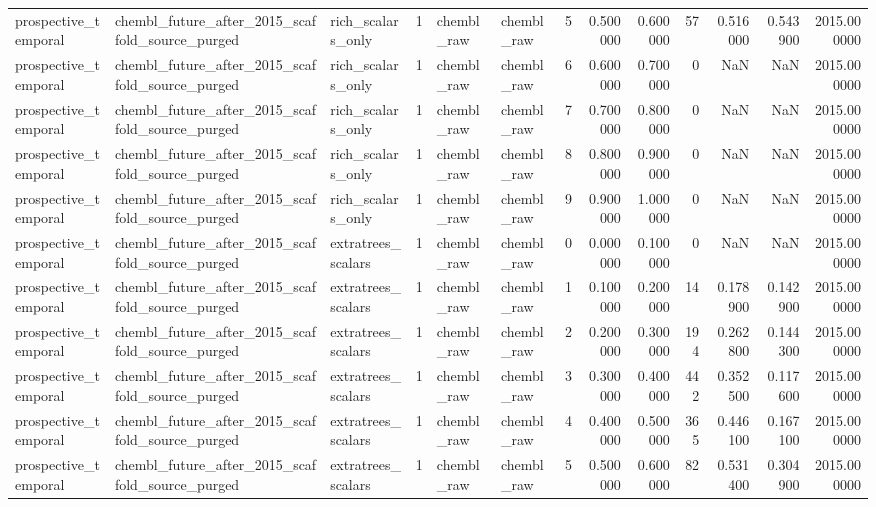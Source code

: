 \begin{longtable}{lllrllrrrrrrr}
prospective\_temporal & chembl\_future\_after\_2015\_scaffold\_source\_purged & rich\_scalars\_only & 1 & chembl\_raw & chembl\_raw & 5 & 0.500000 & 0.600000 & 57 & 0.516000 & 0.543900 & 2015.000000 \\
prospective\_temporal & chembl\_future\_after\_2015\_scaffold\_source\_purged & rich\_scalars\_only & 1 & chembl\_raw & chembl\_raw & 6 & 0.600000 & 0.700000 & 0 & NaN & NaN & 2015.000000 \\
prospective\_temporal & chembl\_future\_after\_2015\_scaffold\_source\_purged & rich\_scalars\_only & 1 & chembl\_raw & chembl\_raw & 7 & 0.700000 & 0.800000 & 0 & NaN & NaN & 2015.000000 \\
prospective\_temporal & chembl\_future\_after\_2015\_scaffold\_source\_purged & rich\_scalars\_only & 1 & chembl\_raw & chembl\_raw & 8 & 0.800000 & 0.900000 & 0 & NaN & NaN & 2015.000000 \\
prospective\_temporal & chembl\_future\_after\_2015\_scaffold\_source\_purged & rich\_scalars\_only & 1 & chembl\_raw & chembl\_raw & 9 & 0.900000 & 1.000000 & 0 & NaN & NaN & 2015.000000 \\
prospective\_temporal & chembl\_future\_after\_2015\_scaffold\_source\_purged & extratrees\_scalars & 1 & chembl\_raw & chembl\_raw & 0 & 0.000000 & 0.100000 & 0 & NaN & NaN & 2015.000000 \\
prospective\_temporal & chembl\_future\_after\_2015\_scaffold\_source\_purged & extratrees\_scalars & 1 & chembl\_raw & chembl\_raw & 1 & 0.100000 & 0.200000 & 14 & 0.178900 & 0.142900 & 2015.000000 \\
prospective\_temporal & chembl\_future\_after\_2015\_scaffold\_source\_purged & extratrees\_scalars & 1 & chembl\_raw & chembl\_raw & 2 & 0.200000 & 0.300000 & 194 & 0.262800 & 0.144300 & 2015.000000 \\
prospective\_temporal & chembl\_future\_after\_2015\_scaffold\_source\_purged & extratrees\_scalars & 1 & chembl\_raw & chembl\_raw & 3 & 0.300000 & 0.400000 & 442 & 0.352500 & 0.117600 & 2015.000000 \\
prospective\_temporal & chembl\_future\_after\_2015\_scaffold\_source\_purged & extratrees\_scalars & 1 & chembl\_raw & chembl\_raw & 4 & 0.400000 & 0.500000 & 365 & 0.446100 & 0.167100 & 2015.000000 \\
prospective\_temporal & chembl\_future\_after\_2015\_scaffold\_source\_purged & extratrees\_scalars & 1 & chembl\_raw & chembl\_raw & 5 & 0.500000 & 0.600000 & 82 & 0.531400 & 0.304900 & 2015.000000 \\

\end{longtable}
